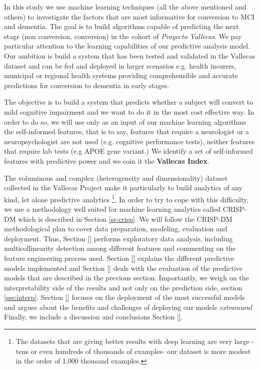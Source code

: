 \documentclass[11pt]{article}
\begin{document}
In this study we use machine learning techniques (all the above mentioned and others) to investigate the factors that are most informative for conversion to MCI and dementia. The goal is to build algorithms capable of predicting the next stage (non conversion, conversion) in the cohort of \emph{Proyecto Vallecas}. We pay particular attention to the learning capabilities of our predictive analysis model. Our ambition is build a system that has been tested and validated in the Vallecas dataset and can be fed and deployed in larger scenarios e.g. health insurers, municipal or regional health systems providing comprehensible and accurate predictions for conversion to dementia in early stages.

The objective is to build a system that predicts whether a subject will convert to mild cognitive impairment and we want to do it in the most cost effective way. In order to do so, we will use only as an input of our machine learning algorithms the self-informed features, that is to say, features that require a neurologist or a neuropsychologist are not used (e.g. cognitive performance tests), neither features that require lab tests (e.g APOE gene variant.)
We identify a set of self-informed features with predictive power and we coin it the \textbf{Vallecas Index}. 

 The voluminous and complex (heterogeneity and dimensionality) dataset collected in the Vallecas Project make it particularly to build analytics of any kind, let alone predictive analytics \footnote{The datasets that are giving better results with deep learning are very large -tens or even hundreds of thousands of examples- our dataset is more modest in the order of 1,000 thousand examples.}. In order to try to cope with this difficulty, we use a methodology well suited for machine learning analytics called CRISP-DM which is described in Section \ref{se:crisp}. We will follow the CRISP-DM methodological plan to cover data preparation, modeling, evaluation and deployment. Thus, Section \ref{} performs exploratory data analysis, including multicollinearity detection among different features and commenting on the feature engineering process used. Section \ref{} explains the different predictive models implemented and Section \ref{} deals with the evaluation of the predictive models that are described in the previous section. Importantly, we weigh on the interpretability side of the results and not only on the prediction side, section \ref{sse:interp}.
 Section \ref{} focuses on the deployment of the most successful models and argues about the benefits and challenges of deploying our models \emph{extramural} Finally, we include a discussion and conclusions Section \ref{}.
\end{document}
